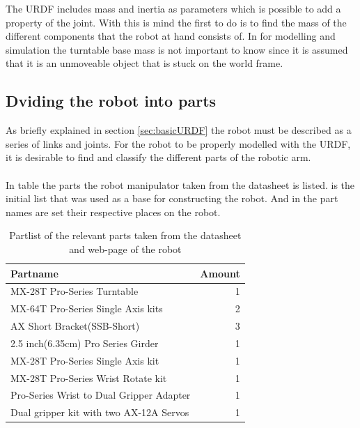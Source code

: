 The URDF includes mass and inertia as parameters which is possible to add a property of the joint. With this is mind the first to do is to find the mass of the different components that the robot at hand consists of. In  for modelling and simulation the turntable base mass is not important to know since it is assumed that it is an unmoveable object that is stuck on the world frame. \\

\subsection{Dviding the robot into parts}
As briefly explained in section \ref{sec:basicURDF} the robot must be described as a series of links and joints. For the robot to be properly modelled with the URDF, it is desirable to find and classify the different parts of the robotic arm.\\\\
In table  the parts the robot manipulator taken from the datasheet is listed\cite{Crustcrawler}.  is the initial list that was used as a base for constructing the robot. And in  the part names are set their respective places on the robot. 

\begin{table}[htbp]
\centering
\caption{Partlist of the relevant parts taken from the datasheet and web-page of the robot}
\label{table:partlist}
    \begin{tabular}{ l r}
        \toprule
        Partname  & Amount \\
        \midrule
        MX-28T Pro-Series Turntable & 1\\
        MX-64T Pro-Series Single Axis kits& 2\\
        AX Short Bracket(SSB-Short) & 3\\
        2.5 inch(6.35cm) Pro Series Girder & 1 \\
        MX-28T Pro-Series Single Axis kit & 1 \\
        MX-28T Pro-Series Wrist Rotate kit & 1\\
        Pro-Series Wrist to Dual Gripper Adapter & 1\\
        Dual gripper kit with two AX-12A Servos& 1\\
               \bottomrule
    \end{tabular}
\end{table}



